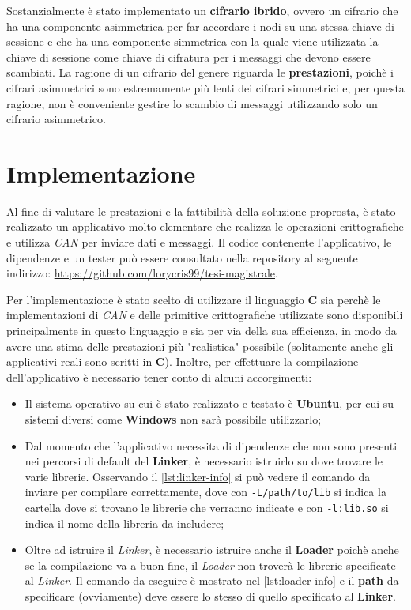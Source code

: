 Sostanzialmente è stato implementato un \textbf{cifrario ibrido}, ovvero un cifrario che ha una componente asimmetrica per far accordare i nodi su una stessa chiave di sessione e che ha una componente simmetrica con la quale viene utilizzata la chiave di sessione come chiave di cifratura per i messaggi che devono essere scambiati. La ragione di un cifrario del genere riguarda le \textbf{prestazioni}, poichè i cifrari asimmetrici sono estremamente più lenti dei cifrari simmetrici e, per questa ragione, non è conveniente gestire lo scambio di messaggi utilizzando solo un cifrario asimmetrico.

\section{Implementazione}
Al fine di valutare le prestazioni e la fattibilità della soluzione proprosta, è stato realizzato un applicativo molto elementare che realizza le operazioni crittografiche e utilizza \emph{CAN} per inviare dati e messaggi. Il codice contenente l'applicativo, le dipendenze e un tester può essere consultato nella repository al seguente indirizzo: \url{https://github.com/lorycris99/tesi-magistrale}.

Per l'implementazione è stato scelto di utilizzare il linguaggio \textbf{C} sia perchè le implementazioni di \emph{CAN} e delle primitive crittografiche utilizzate sono disponibili principalmente in questo linguaggio e sia per via della sua efficienza, in modo da avere una stima delle prestazioni più "realistica" possibile (solitamente anche gli applicativi reali sono scritti in \textbf{C}). Inoltre, per effettuare la compilazione dell'applicativo è necessario tener conto di alcuni accorgimenti:
\begin{itemize}
    \item Il sistema operativo su cui è stato realizzato e testato è \textbf{Ubuntu}, per cui su sistemi diversi come \textbf{Windows} non sarà possibile utilizzarlo;
    \item Dal momento che l'applicativo necessita di dipendenze che non sono presenti nei percorsi di default del \textbf{Linker}, è necessario istruirlo su dove trovare le varie librerie. Osservando il \autoref{lst:linker-info} si può vedere il comando da inviare per compilare correttamente, dove con \texttt{-L/path/to/lib} si indica la cartella dove si trovano le librerie che verranno indicate e con \texttt{-l:lib.so} si indica il nome della libreria da includere;
    \item Oltre ad istruire il \emph{Linker}, è necessario istruire anche il \textbf{Loader} poichè anche se la compilazione va a buon fine, il \emph{Loader} non troverà le librerie specificate al \emph{Linker}. Il comando da eseguire è mostrato nel \autoref{lst:loader-info} e il \textbf{path} da specificare (ovviamente) deve essere lo stesso di quello specificato al \textbf{Linker}.
\end{itemize}

